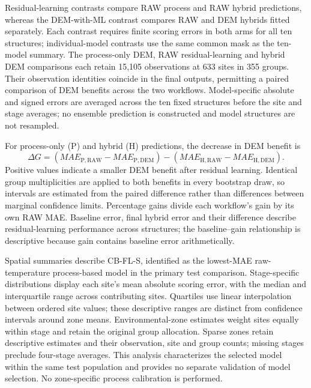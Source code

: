 \documentclass[a4paper,12pt]{article}
\begin{document}
Residual-learning contrasts compare RAW process and RAW hybrid predictions, whereas the DEM-with-ML contrast compares RAW and DEM hybrids fitted separately. Each contrast requires finite scoring errors in both arms for all ten structures; individual-model contrasts use the same common mask as the ten-model summary. The process-only DEM, RAW residual-learning and hybrid DEM comparisons each retain 15,105 observations at 633 sites in 355 groups. Their observation identities coincide in the final outputs, permitting a paired comparison of DEM benefits across the two workflows. Model-specific absolute and signed errors are averaged across the ten fixed structures before the site and stage averages; no ensemble prediction is constructed and model structures are not resampled.

For process-only (P) and hybrid (H) predictions, the decrease in DEM benefit is
\begin{equation}
\Delta G=(MAE_{\mathrm{P,RAW}}-MAE_{\mathrm{P,DEM}})
-(MAE_{\mathrm{H,RAW}}-MAE_{\mathrm{H,DEM}}).
\label{eq:dem_gain_decrease}
\end{equation}
Positive values indicate a smaller DEM benefit after residual learning. Identical group multiplicities are applied to both benefits in every bootstrap draw, so intervals are estimated from the paired difference rather than differences between marginal confidence limits. Percentage gains divide each workflow's gain by its own RAW MAE. Baseline error, final hybrid error and their difference describe residual-learning performance across structures; the baseline--gain relationship is descriptive because gain contains baseline error arithmetically.

Spatial summaries describe CB-FL-S, identified as the lowest-MAE raw-temperature process-based model in the primary test comparison. Stage-specific distributions display each site's mean absolute scoring error, with the median and interquartile range across contributing sites. Quartiles use linear interpolation between ordered site values; these descriptive ranges are distinct from confidence intervals around zone means. Environmental-zone estimates weight sites equally within stage and retain the original group allocation. Sparse zones retain descriptive estimates and their observation, site and group counts; missing stages preclude four-stage averages. This analysis characterizes the selected model within the same test population and provides no separate validation of model selection. No zone-specific process calibration is performed.
\end{document}
